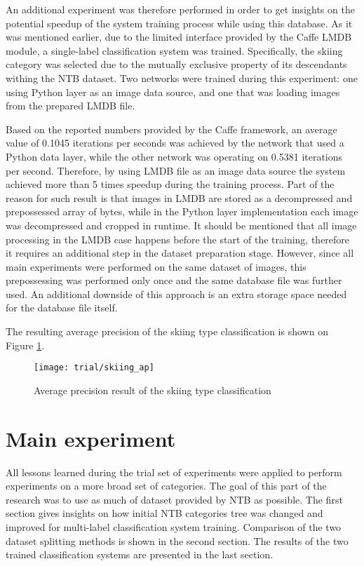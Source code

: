     An additional experiment was therefore performed in order to get insights on the potential speedup of the system training process while using this database. As it was mentioned earlier, due to the limited interface provided by the Caffe LMDB module, a single-label classification system was trained. Specifically, the skiing category was selected due to the mutually exclusive property of its descendants withing the NTB dataset. Two networks were trained during this experiment: one using Python layer as an image data source, and one that was loading images from the prepared LMDB file.
    
    Based on the reported numbers provided by the Caffe framework, an average value of 0.1045 iterations per seconds was achieved by the network that used a Python data layer, while the other network was operating on 0.5381 iterations per second. Therefore, by using LMDB file as an image data source the system achieved more than 5 times speedup during the training process. Part of the reason for such result is that images in LMDB are stored as a decompressed and prepossessed array of bytes, while in the Python layer implementation each image was decompressed and cropped in runtime. It should be mentioned that all image processing in the LMDB case happens before the start of the training, therefore it requires an additional step in the dataset preparation stage. However, since all main experiments were performed on the same dataset of images, this prepossessing was performed only once and the same database file was further used. An additional downside of this approach is an extra storage space needed for the database file itself.
    
    The resulting average precision of the skiing type classification is shown on Figure \ref{fig:trial-skiing-ap}.
    
    \begin{figure}[H]
        \centering
        \texttt{[image: trial/skiing\_ap]}
        \caption{Average precision result of the skiing type classification}
        \label{fig:trial-skiing-ap}
    \end{figure}
    

\section{Main experiment}
All lessons learned during the trial set of experiments were applied to perform experiments on a more broad set of categories. The goal of this part of the research was to use as much of dataset provided by NTB as possible. The first section gives insights on how initial NTB categories tree was changed and improved for multi-label classification system training. Comparison of the two dataset splitting methods is shown in the second section. The results of the two trained classification systems are presented in the last section.

